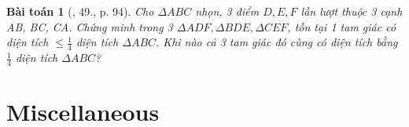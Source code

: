 \documentclass{article}
\newtheorem{baitoan}{Bài toán}
\begin{document}
\begin{baitoan}[\cite{Binh_Toan_9_tap_1}, 49., p. 94]
	Cho $\Delta ABC$ nhọn, 3 điểm $D,E,F$ lần lượt thuộc 3 cạnh AB, BC, CA. Chứng minh trong 3 $\Delta ADF,\Delta BDE,\Delta CEF$, tồn tại 1 tam giác có diện tích $\le\frac{1}{4}$ diện tích $\Delta ABC$. Khi nào cả 3 tam giác đó cùng có diện tích bằng $\frac{1}{4}$ diện tích $\Delta ABC$?
\end{baitoan}


\section{Miscellaneous}


\printbibliography[heading=bibintoc]
\end{document}
